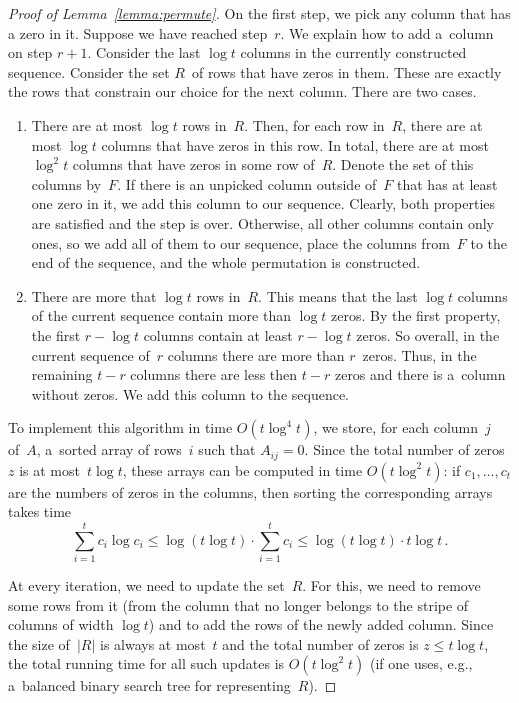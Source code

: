 \begin{proof}[Proof of Lemma~\ref{lemma:permute}]
On the first step, we pick any column that has a zero in it. Suppose
we have reached step~$r$. We explain how to add a~column on
step $r+1$. Consider the last $\log t$ columns in the currently
constructed sequence. Consider the set $R$~of rows that have
zeros in them. These are exactly the rows that constrain our
choice for the next column. There are two cases.
\begin{enumerate}
\item There are at most $\log t$ rows in~$R$. Then, for each row in~$R$, there
are at most $\log t$ columns that have zeros in this row. In total, there are at
most $\log^2 t$ columns that have zeros in some row of~$R$. Denote the set of
this columns by~$F$. If there is an unpicked column outside of~$F$ that has at
least one zero in it, we add this column to our sequence. Clearly, both
properties are satisfied and the step is over. Otherwise, all other columns
contain only ones, so we add all of them to our sequence, place the columns
from~$F$ to the end of the sequence, and the whole permutation is constructed.
\item There are more that $\log t$ rows in~$R$. This means that the last
$\log t$ columns of the current sequence contain more than $\log t$ zeros. By
the first property, the first $r - \log t$ columns contain at least $r - \log t$
zeros. So overall, in the current sequence of~$r$ columns there are more than
$r$~zeros. Thus, in the remaining $t-r$ columns there are less then $t-r$ zeros
and there is a~column without zeros. We add this column to the sequence.
\end{enumerate}


To implement this algorithm in time $O(t\log^{4}t)$, we store, for each
column~$j$ of~$A$, a~sorted array of rows~$i$ such that $A_{ij}=0$. Since the
total number of zeros~$z$ is at most~$t\log t$, these arrays can be computed in
time $O(t\log^2t)$: if $c_1, \dotsc, c_t$ are the numbers of zeros in the
columns, then sorting the corresponding arrays takes time
\[\sum_{i=1}^{t}c_i \log c_i \le \log(t \log t) \cdot \sum_{i=1}^{t}c_i \le \log(t \log t) \cdot t\log t \, .\]

At every iteration, we need to update the set~$R$. For this, we need to remove
some rows from it (from the column that no longer belongs to the stripe of
columns of width $\log t$) and to add the rows of the newly added column. Since
the size of~$|R|$ is always at most~$t$ and the total number of zeros is
$z \le t\log t$, the total running time for all such updates is
$O(t\log^2t)$ (if one uses, e.g., a~balanced binary search tree for
representing~$R$).


\end{proof}
